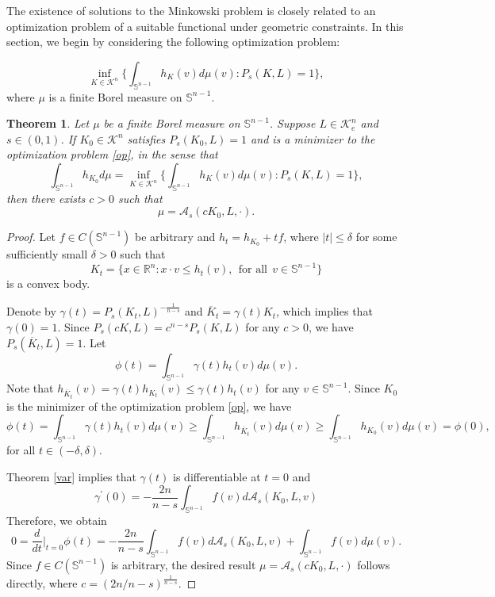 \documentclass[12pt, oneside,reqno]{amsart}
\numberwithin{equation}{section}
\newtheorem{theorem}{Theorem}[section]
\newtheorem{lemma}[theorem]{Lemma}
\newtheorem{definition and theorem}[theorem]{Definition and Theorem}
\newcommand{\tA}{\mathcal{A}_s}
\theoremstyle{plain}
\theoremstyle{remark}
\theoremstyle{definition}
\newcommand{\sn}{{\mathbb S}^{n-1}}
\newcommand{\rn}{\mathbb R^n}
\newcommand{\tk}{\mathcal{K}}
\begin{document}
The existence of solutions to the Minkowski problem is closely related to an optimization problem of a suitable functional under geometric constraints. In this section, we begin by considering the following optimization problem:

\begin{equation}\label{op}
    \underset{K\in\tk^n}{\inf}\Big\{\int_{\sn}h_K(v)d\mu(v): P_s(K,L)=1\Big\},
\end{equation}
where $\mu$ is a finite Borel measure on $\sn$.

 
\begin{theorem}\label{min-prob-ex}
    Let $\mu$ be a finite Borel measure on $\sn$. Suppose $L\in\tk_e^n$ and $s\in(0,1)$. If $K_0\in\tk^n$ satisfies $P_s(K_0,L)=1$ and is a minimizer to the optimization problem \eqref{op}, in the sense that
    \[\int_{\sn}h_{K_0}d\mu=\underset{K\in\tk^n}{\inf}\Big\{\int_{\sn}h_K(v)d\mu(v): P_s(K,L)=1\Big\},\]
    then there exists $c>0$ such that
    \[\mu=\tA(cK_0,L,\cdot).\]
\end{theorem}

\begin{proof}
Let $f\in C(\sn)$ be arbitrary and $h_t=h_{K_0}+tf$, where $|t|\leq \delta$ for some sufficiently small $\delta>0$ such that
\[K_t=\{x\in\rn:  x\cdot v  \leq h_t(v),~~\text{for all}~~v\in\sn\}\]
is a convex body. 

Denote by $\gamma(t)=P_s(K_t,L)^{-\frac{1}{n-s}}$ and $\overline{K}_t=\gamma(t)K_t$, which implies that $\gamma(0)=1$. Since $P_s(cK,L)=c^{n-s}P_s(K,L)$ for any $c>0$, we have $P_s(\overline{K}_t,L)=1$. Let
\[\phi(t)=\int_{\sn}\gamma(t)h_t(v)d\mu(v).\]
Note that $h_{\overline{K}_t}(v)=\gamma(t)h_{K_t}(v)\leq \gamma(t)h_t(v)$ for any $v\in\sn$. Since $K_0$ is the minimizer of the optimization problem \eqref{op}, we have
\[\phi(t)=\int_{\sn}\gamma(t)h_t(v)d\mu(v)\ge\int_{\sn}h_{\overline{K}_t}(v)d\mu(v)\ge\int_{\sn}h_{K_0}(v)d\mu(v)=\phi(0),\]
for all $t\in(-\delta,\delta)$.

Theorem \ref{var} implies that $\gamma(t)$ is differentiable at $t=0$ and
\[\gamma^{\prime}(0)=-\frac{2n}{n-s}\int_{\sn}f(v)d\tA(K_0,L,v)\]
Therefore, we obtain
\[0=\frac{d}{dt}\Big|_{t=0}\phi(t)=-\frac{2n}{n-s}\int_{\sn}f(v)d\tA(K_0,L,v)+\int_{\sn}f(v)d\mu(v).\]
Since $f\in C(\sn)$ is arbitrary, the desired result $\mu=\tA(cK_0,L,\cdot)$ follows directly, where  $c=(2n/n-s)^{\frac{1}{n-s}}$.
\end{proof}

\end{document}
